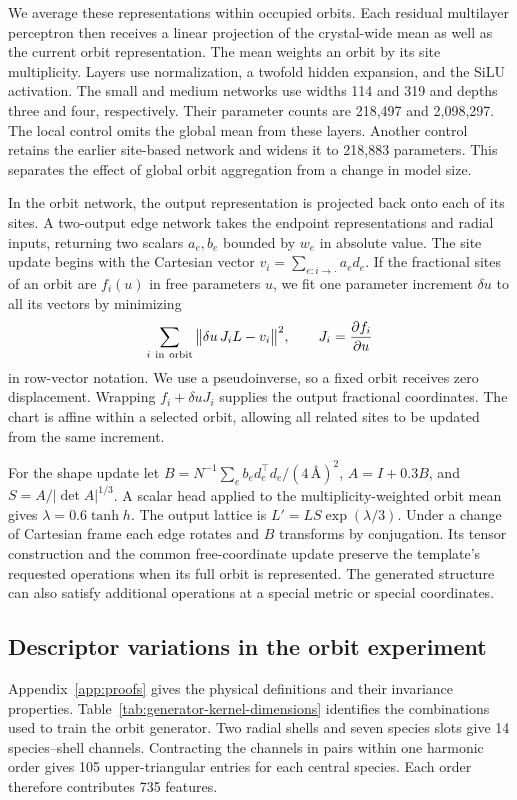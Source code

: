 We average these representations within occupied orbits. Each residual multilayer perceptron then receives a linear projection of the crystal-wide mean as well as the current orbit representation. The mean weights an orbit by its site multiplicity. Layers use normalization, a twofold hidden expansion, and the SiLU activation. The small and medium networks use widths 114 and 319 and depths three and four, respectively. Their parameter counts are 218,497 and 2,098,297. The local control omits the global mean from these layers. Another control retains the earlier site-based network and widens it to 218,883 parameters. This separates the effect of global orbit aggregation from a change in model size.

In the orbit network, the output representation is projected back onto each of its sites. A two-output edge network takes the endpoint representations and radial inputs, returning two scalars $a_e,b_e$ bounded by $w_e$ in absolute value. The site update begins with the Cartesian vector $v_i=\sum_{e:i\to\cdot}a_e d_e$. If the fractional sites of an orbit are $f_i(u)$ in free parameters $u$, we fit one parameter increment $\delta u$ to all its vectors by minimizing
\[
 \sum_{i\ {\rm in\ orbit}}
 \big\|\delta u\, J_i L-v_i\big\|^2,
 \qquad J_i=\frac{\partial f_i}{\partial u}
\]
in row-vector notation. We use a pseudoinverse, so a fixed orbit receives zero displacement. Wrapping $f_i+\delta u J_i$ supplies the output fractional coordinates. The chart is affine within a selected orbit, allowing all related sites to be updated from the same increment.

For the shape update let $B=N^{-1}\sum_e b_e d_e^\top d_e/(4\,\text{\AA})^2$, $A=I+0.3 B$, and $S=A/|\det A|^{1/3}$. A scalar head applied to the multiplicity-weighted orbit mean gives $\lambda=0.6\tanh h$. The output lattice is $L'=L S\exp(\lambda/3)$. Under a change of Cartesian frame each edge rotates and $B$ transforms by conjugation. Its tensor construction and the common free-coordinate update preserve the template's requested operations when its full orbit is represented. The generated structure can also satisfy additional operations at a special metric or special coordinates.

\subsection{Descriptor variations in the orbit experiment}

Appendix~\ref{app:proofs} gives the physical definitions and their invariance properties. Table~\ref{tab:generator-kernel-dimensions} identifies the combinations used to train the orbit generator. Two radial shells and seven species slots give 14 species--shell channels. Contracting the channels in pairs within one harmonic order gives 105 upper-triangular entries for each central species. Each order therefore contributes 735 features.

